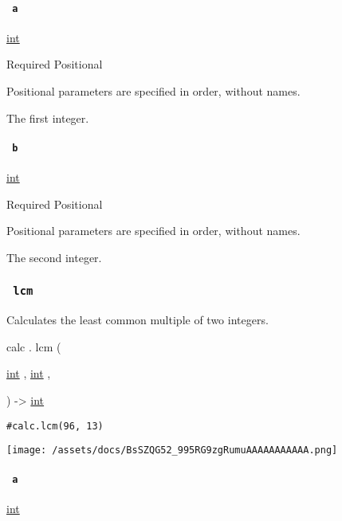 \paragraph{\texorpdfstring{\texttt{\ a\ }}{ a }}\label{functions-gcd-a}

\href{/docs/reference/foundations/int/}{int}

{Required} {{ Positional }}

\label{functions-gcd-a-positional-tooltip}
Positional parameters are specified in order, without names.

The first integer.

\paragraph{\texorpdfstring{\texttt{\ b\ }}{ b }}\label{functions-gcd-b}

\href{/docs/reference/foundations/int/}{int}

{Required} {{ Positional }}

\label{functions-gcd-b-positional-tooltip}
Positional parameters are specified in order, without names.

The second integer.

\subsubsection{\texorpdfstring{\texttt{\ lcm\ }}{ lcm }}\label{functions-lcm}

Calculates the least common multiple of two integers.

calc { . } { lcm } (

{ \href{/docs/reference/foundations/int/}{int} , } {
\href{/docs/reference/foundations/int/}{int} , }

) -\textgreater{} \href{/docs/reference/foundations/int/}{int}

\begin{verbatim}
#calc.lcm(96, 13)
\end{verbatim}

\texttt{[image: /assets/docs/BsSZQG52\_995RG9zgRumuAAAAAAAAAAA.png]}

\paragraph{\texorpdfstring{\texttt{\ a\ }}{ a }}\label{functions-lcm-a}

\href{/docs/reference/foundations/int/}{int}

